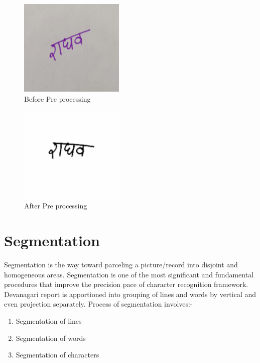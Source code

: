 \begin{figure}[H]
    \centering
    \includegraphics[width=50mm]{figures/image1.png}
    \caption{Before Pre processing}
\end{figure}

\begin{figure}[H]
    \centering
    \includegraphics[width=50mm]{figures/image2.png}
    \caption{After Pre processing}
\end{figure}

\newpage

\section{Segmentation}
Segmentation is the way toward parceling a picture/record into disjoint and homogeneous areas. Segmentation is one of the most significant and fundamental procedures that improve the precision pace of character recognition framework. Devanagari report is apportioned into grouping of lines and words by vertical and even projection separately. Process of segmentation involves:-
\begin{enumerate}
\item Segmentation of lines
\item Segmentation of words 
\item Segmentation of characters 
\end{enumerate}

